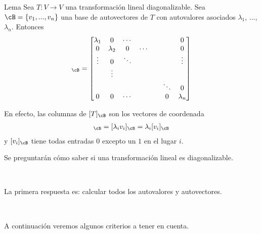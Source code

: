 \documentclass[handout]{beamer} %
\begin{document}
\begin{frame}
    
    \begin{block}{Lema}
        Sea $T:V\longrightarrow V$ una transformación lineal diagonalizable. Sea $\cB=\{v_1, ..., v_n\}$ una base de autovectores de $T$ con autovalores asociados $\lambda_1$, ..., $\lambda_n$. Entonces 
        \begin{align*}
            [T]_\cB=
            \begin{bmatrix}
                \lambda_1 & 0 & \cdots & & &  & 0\\ 
                0 & \lambda_2 & 0& \cdots & &  & 0\\
                \vdots & 0 & \ddots & & &  & \vdots\\
                & \vdots &  & & & &  \\
                & &  & & &  \ddots&0\\
                0 & 0 & \cdots & & & 0 & \lambda_{n}
            \end{bmatrix}
        \end{align*}
    \end{block}
    
    En efecto, las columnas de $[T]_\cB$ son los vectores de coordenada
    \begin{align*}
        [T(v_i)]_\cB=[\lambda_i v_i]_\cB=\lambda_i[v_i]_\cB
    \end{align*}
    y $[v_i]_\cB$ tiene todas entradas $0$ excepto un $1$ en el lugar $i$.
    
\end{frame}

\begin{frame}
    Se preguntarán cómo saber si una transformación lineal es diagonalizable.\pause
    
    \
    
    La primera respuesta es: calcular todos los autovalores y autovectores.\pause
    
    \
    
    A continuación veremos algunos criterios a tener en cuenta.\pause
\end{frame}
\end{document}

